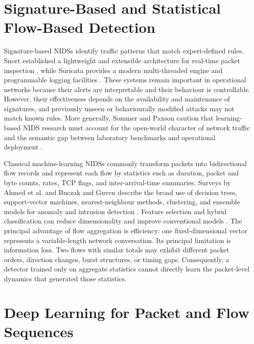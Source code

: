 \documentclass[11pt,fleqn]{report}
\begin{document}
\section{Signature-Based and Statistical Flow-Based Detection}
\label{subsec:rw_signature_flow}

Signature-based NIDSs identify traffic patterns that match expert-defined rules. Snort established a lightweight and extensible architecture for real-time packet inspection \cite{Roesch1999}, while Suricata provides a modern multi-threaded engine and programmable logging facilities \cite{SuricataGuide2026}. These systems remain important in operational networks because their alerts are interpretable and their behaviour is controllable. However, their effectiveness depends on the availability and maintenance of signatures, and previously unseen or behaviourally modified attacks may not match known rules. More generally, Sommer and Paxson caution that learning-based NIDS research must account for the open-world character of network traffic and the semantic gap between laboratory benchmarks and operational deployment \cite{SommerPaxson2010}.

Classical machine-learning NIDSs commonly transform packets into bidirectional flow records and represent each flow by statistics such as duration, packet and byte counts, rates, TCP flags, and inter-arrival-time summaries. Surveys by Ahmed et al. and Buczak and Guven describe the broad use of decision trees, support-vector machines, nearest-neighbour methods, clustering, and ensemble models for anomaly and intrusion detection \cite{Ahmed2016Survey,BuczakGuven2016}. Feature selection and hybrid classification can reduce dimensionality and improve conventional models \cite{Aljawarneh2018}. The principal advantage of flow aggregation is efficiency: one fixed-dimensional vector represents a variable-length network conversation. Its principal limitation is information loss. Two flows with similar totals may exhibit different packet orders, direction changes, burst structures, or timing gaps. Consequently, a detector trained only on aggregate statistics cannot directly learn the packet-level dynamics that generated those statistics.

\section{Deep Learning for Packet and Flow Sequences}
\label{subsec:rw_deep_sequences}
\end{document}
